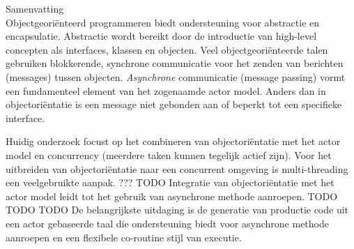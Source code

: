 \vspace*{20mm}

{Samenvatting}\label{sec:abstract-diff} \\
Objectgeoriënteerd programmeren biedt ondersteuning voor abstractie en encapsulatie.
Abstractie wordt bereikt door de introductie van high-level concepten als interfaces,
klassen en objecten.
Veel objectgeoriënteerde talen gebruiken blokkerende, synchrone communicatie voor het zenden van berichten (messages) tussen objecten.
\emph{Asynchrone} communicatie (message passing) vormt een fundamenteel element van het zogenaamde actor model.
Anders dan in objectoriëntatie is een message niet gebonden aan of beperkt tot een specifieke interface.

Huidig onderzoek focust op het combineren van objectoriëntatie met het actor model en concurrency (meerdere taken kunnen tegelijk actief zijn).
Voor het uitbreiden van objectoriëntatie naar een concurrent omgeving is multi-threading een veelgebruikte aanpak.
??? TODO
Integratie van objectoriëntatie met het actor model leidt tot het gebruik van asynchrone methode aanroepen.
TODO
TODO
TODO
De belangrijkste uitdaging is de generatie van productie code uit een actor gebaseerde taal die ondersteuning biedt voor asynchrone methode aanroepen en een flexibele co-routine stijl van executie.

